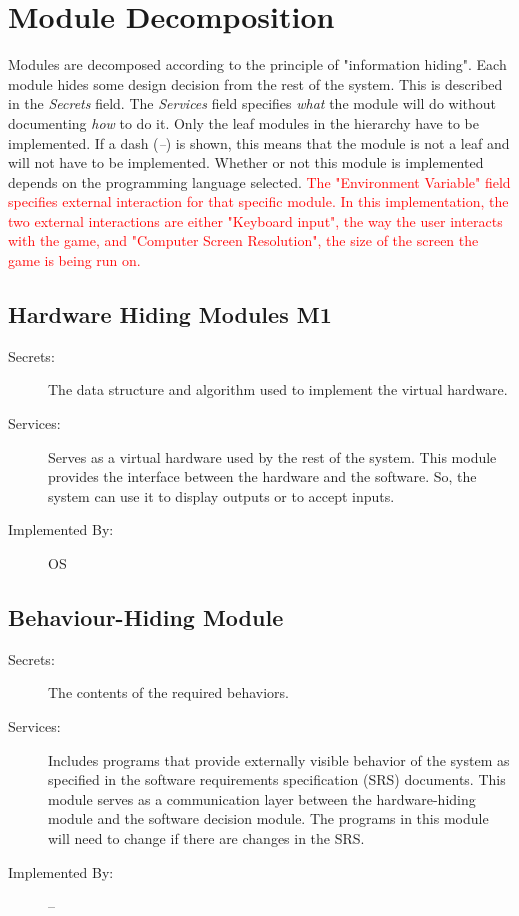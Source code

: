 \documentclass[12pt]{article}
\begin{document}
\section{Module Decomposition}
Modules are decomposed according to the principle of "information hiding". Each module hides some design decision from the rest of the system. This is described in the \textit{Secrets} field. The \textit{Services} field specifies \textit{what} the module will do without documenting \textit{how} to do it. Only the leaf modules in the hierarchy have to be implemented. If a dash (\emph{--}) is shown, this means that the module is not a leaf and will not have to be implemented. Whether or not this module is implemented depends on the programming language selected. \textcolor{red}{The "Environment Variable" field specifies external interaction for that specific module. In this implementation, the two external interactions are either "Keyboard input", the way the user interacts with the game, and "Computer Screen Resolution", the size of the screen the game is being run on.}

\subsection{Hardware Hiding Modules \textbf{M1}}

\begin{description}
\item[Secrets:]The data structure and algorithm used to implement the virtual
  hardware.
\item[Services:]Serves as a virtual hardware used by the rest of the
  system. This module provides the interface between the hardware and the
  software. So, the system can use it to display outputs or to accept inputs.
\item[Implemented By:] OS
\end{description}

\subsection{Behaviour-Hiding Module}

\begin{description}
\item[Secrets:]The contents of the required behaviors.
\item[Services:]Includes programs that provide externally visible behavior of
  the system as specified in the software requirements specification (SRS)
  documents. This module serves as a communication layer between the
  hardware-hiding module and the software decision module. The programs in this
  module will need to change if there are changes in the SRS.
\item[Implemented By:] --
\end{description}
\end{document}
